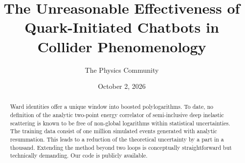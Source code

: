 \documentclass[11pt]{article}
\title{The Unreasonable Effectiveness of Quark-Initiated Chatbots in Collider Phenomenology}
\author{The Physics Community}
\date{October 2, 2026}
\numberwithin{equation}{section}
\theoremstyle{definition}
\theoremstyle{remark}
\begin{document}
\maketitle
\begin{abstract}
Ward identities offer a unique window into boosted polylogarithms. To
date, no definition of the analytic two-point energy correlator of
semi-inclusive deep inelastic scattering is known to be free of
non-global logarithms within statistical uncertainties. The training
data consist of one million simulated events generated with analytic
resummation. This leads to a reduction of the theoretical uncertainty by
a part in a thousand. Extending the method beyond two loops is
conceptually straightforward but technically demanding. Our code is
publicly available.
\end{abstract}
\tableofcontents



\nocite{*}


\end{document}
